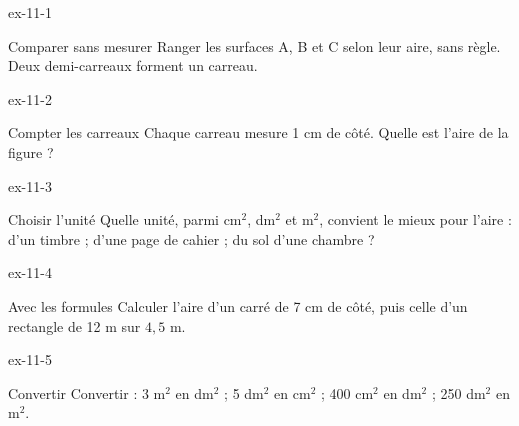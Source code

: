 \clearpage{}
\begin{blocLivre}{ex-11-1}\begin{exercice}[1]{Comparer sans mesurer}
Ranger les surfaces A, B et C selon leur aire, sans règle. Deux demi-carreaux forment un carreau.
\label{fig-ex-11-1}
\end{exercice}\end{blocLivre}
\begin{blocLivre}{ex-11-2}\begin{exercice}[1]{Compter les carreaux}
Chaque carreau mesure 1 cm de côté. Quelle est l’aire de la figure ?
\label{fig-ex-11-2}
\end{exercice}\end{blocLivre}
\begin{blocLivre}{ex-11-3}\begin{exercice}[1]{Choisir l’unité}
Quelle unité, parmi cm$^2$, dm$^2$ et m$^2$, convient le mieux pour l’aire : d’un timbre ; d’une page de cahier ; du sol d’une chambre ?
\end{exercice}\end{blocLivre}
\begin{blocLivre}{ex-11-4}\begin{exercice}[1]{Avec les formules}
Calculer l’aire d’un carré de 7 cm de côté, puis celle d’un rectangle de 12 m sur $4{,}5$ m.
\end{exercice}\end{blocLivre}
\begin{blocLivre}{ex-11-5}\begin{exercice}[1]{Convertir}
Convertir : 3 m$^2$ en dm$^2$ ; 5 dm$^2$ en cm$^2$ ; 400 cm$^2$ en dm$^2$ ; 250 dm$^2$ en m$^2$.
\end{exercice}\end{blocLivre}

